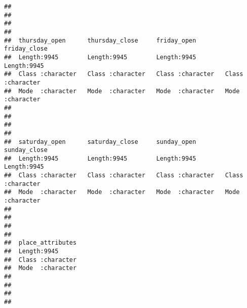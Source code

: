\documentclass[
]{article}
\begin{document}
\begin{verbatim}
##                                                                             
##                                                                             
##                                                                             
##                                                                             
##  thursday_open      thursday_close     friday_open        friday_close      
##  Length:9945        Length:9945        Length:9945        Length:9945       
##  Class :character   Class :character   Class :character   Class :character  
##  Mode  :character   Mode  :character   Mode  :character   Mode  :character  
##                                                                             
##                                                                             
##                                                                             
##                                                                             
##  saturday_open      saturday_close     sunday_open        sunday_close      
##  Length:9945        Length:9945        Length:9945        Length:9945       
##  Class :character   Class :character   Class :character   Class :character  
##  Mode  :character   Mode  :character   Mode  :character   Mode  :character  
##                                                                             
##                                                                             
##                                                                             
##                                                                             
##  place_attributes  
##  Length:9945       
##  Class :character  
##  Mode  :character  
##                    
##                    
##                    
## 
\end{verbatim}
\end{document}
